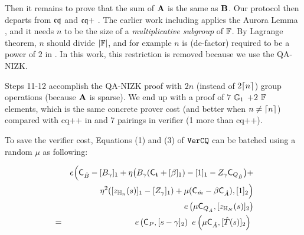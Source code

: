 Then it remains to prove that the sum of ${{\mathbf {A}}}$ is
the same as ${{\mathbf {B}}}$. Our protocol then departs from
${\mathfrak{cq}}$ and ${\mathfrak{cq}}+$ \cite{MatrixLookup}.  The earlier work
including \cite{cq,MatrixLookup}
applies the Aurora Lemma \cite[Remark 5.6]{aurora19}, and it needs
$n$ to be the size of a {\em multiplicative subgroup} of $\mathbb{F}$.
By Lagrange theorem, $n$ should divide $|\mathbb{F}|$, and 
for example $n$ is (de-factor) required to be a power of
$2$ in \cite{MatrixLookup}. In this work, this restriction is removed
because we use the QA-NIZK.

Steps 11-12 accomplish the QA-NIZK proof with $2n$ (instead of
$2{\lceil{n}\rceil}$) group operations (because ${{\mathbf {A}}}$ is sparse).
We end up with a proof of $7$ ${\mathbb{G}}_1$ $+2$ $\mathbb{F}$ elements,
which is the same concrete prover cost (and better
when $n\neq {\lceil{n}\rceil}$) compared with 
cq++ in \cite{MatrixLookup} and 
7 pairings in verifier (1 more than cq++).

To save the verifier cost,
Equations (1) and (3) of ${\texttt{VerCQ}}$ can be batched using 
a random $\mu$ as following:
\begin{small}
\begin{eqnarray*}
 & & e\Big({{\mathsf{C}}_{\hat{B}}} - [B_\gamma]_1 + 
 \eta \big(B_\gamma({\mathsf{C}}_{{{\mathbf {t}}}} + [\beta]_1) - [1]_1 
 	- Z_\gamma{{\mathsf{C}}_{Q_{\hat{B}}}}\big)  
 + \\
 & & ~~\eta^2([z_{\mathbb{H}_{n}}(s)]_1 - [Z_\gamma]_1) + \mu({{\mathsf{C}}_{\hat{m}}} - \beta {{\mathsf{C}}_{\hat{A}}}), 
 	[1]_2\Big)  \\
 & & e\left(\mu {\mathsf{C}}_{{Q_{\hat{A}}}}, [z_{\mathbb{H}_{N}}(s)]_2\right)
 \\
 &=& e\left({{\mathsf{C}}_{P}}, [s-\gamma]_2\right) ~e\left(\mu{{\mathsf{C}}_{\hat{A}}}, [\hat{T}(s)]_2\right) ~
\end{eqnarray*}
\end{small}

